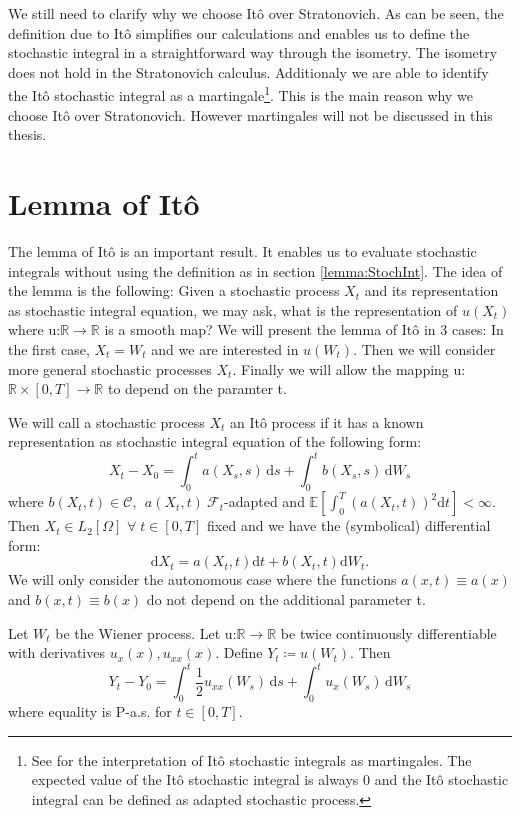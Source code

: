  
We still need to clarify why we choose It\^o over Stratonovich. As can be seen, the definition due to It\^o simplifies our calculations and enables us to define the stochastic integral in a straightforward way through the isometry. The isometry does not hold in the Stratonovich calculus. Additionaly we are able to identify the It\^o stochastic integral as a martingale\footnote{See \cite{Oksendal} for the interpretation of It\^o stochastic integrals as martingales. The expected value of the It\^o stochastic integral is always 0 and the It\^o stochastic integral can be defined as adapted stochastic process.}.
This is the main reason why we choose It\^o over Stratonovich.
However martingales will not be discussed in this thesis.


\section{Lemma of It\^o}
\label{itolemma}
The lemma of It\^o is an important result. It enables us to evaluate stochastic integrals without using the definition as in section \ref{lemma:StochInt}. 
The idea of the lemma is the following: Given a stochastic process \(X_t\) and its representation as stochastic integral equation, we may ask, what is the representation of \(u(X_t)\) where u:\(\mathbb{R}\to\mathbb{R}\) is a smooth map? 
We will present the lemma of It\^o in 3 cases: In the first case, \(X_t=W_t\) and we are interested in \(u(W_t)\). Then we will consider more general stochastic processes \(X_t\). Finally we will allow the mapping u:\(\mathbb{R}\times[0,T]\to\mathbb{R}\) to depend on the paramter t.
\begin{definition}[It\^o process]
\label{Itoprocess}
We will call a stochastic process \(X_t\) an It\^o process if it has a known representation as stochastic integral equation of the following form:
\[X_t - X_0 = \int_0^t \!a(X_s,s)\,\mathrm{d}s + \int_0^t \!b(X_s,s)\,\mathrm{d}W_{s}\]
where \(b(X_t,t)\in\mathcal{C},\:\: a(X_t,t)\: \mathcal{F}_t\)-adapted and \(\mathbb{E}[\int_{0}^{T}(a(X_t,t))^2\mathrm{d}t]<\infty\). \\
Then \(X_t\in L_2[\Omega]\) \(\forall\; t\in[0,T]\) fixed and we have the (symbolical) differential form:
\[\mathrm{d}X_t = a(X_t,t)\mathrm{d}t + b(X_t,t)\mathrm{d}W_t.\]
We will only consider the autonomous case where the functions \(a(x,t) \equiv a(x)\) and \(b(x,t) \equiv b(x)\) do not depend on the additional parameter t.

\end{definition}
\begin{lemma}
Let \(W_t\) be the Wiener process. Let u:\(\mathbb{R}\to\mathbb{R}\) be twice continuously differentiable with derivatives \(u_x(x), u_{xx}(x)\). Define \(Y_t \coloneqq u(W_t)\). Then
\begin{displaymath}
Y_t-Y_0 = \int_0^t \!\frac{1}{2}u_{xx}(W_s)\,\mathrm{d}s + \int_0^t \!u_x(W_s)\,\mathrm{d}W_{s}
\end{displaymath}
where equality is P-a.s. for \(t\in[0,T]\).
\end{lemma}
